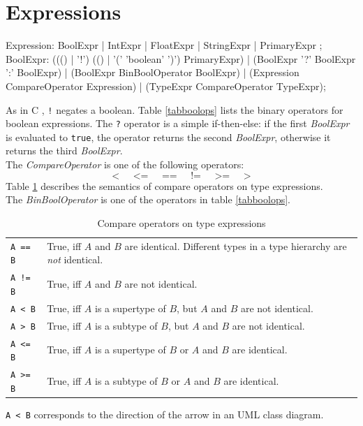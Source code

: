 \section{Expressions}
\label{expressions}
\begin{rail}
  Expression: BoolExpr | IntExpr | FloatExpr | StringExpr | PrimaryExpr ;  
  BoolExpr: ((() | '!') (() | '(' 'boolean' ')') PrimaryExpr) | (BoolExpr '?' BoolExpr ':' BoolExpr) | (BoolExpr BinBoolOperator BoolExpr) | (Expression CompareOperator Expression) | (TypeExpr CompareOperator TypeExpr);
\end{rail}
As in C \cite{Sch:1990:ANSIC}, \texttt{!} negates a boolean. Table \ref{tabboolops} lists the binary operators for boolean expressions. The \texttt{?} operator is a simple if-then-else: if the first \emph{BoolExpr} is evaluated to \texttt{true}, the operator returns the second \emph{BoolExpr}, otherwise it returns the third \emph{BoolExpr}.\\
The \emph{CompareOperator} is one of the following operators:
\[ \texttt{<} \;\;\;\;\; \texttt{<=} \;\;\;\;\; \texttt{==} \;\;\;\;\; \texttt{!=} \;\;\;\;\; \texttt{>=} \;\;\;\;\; \texttt{>} \]
Table \ref{compandtypes} describes the semantics of compare operators on type expressions.\\
The \emph{BinBoolOperator} is one of the operators in table \ref{tabboolops}.
\begin{table}[htbp]
\label{compandtypes} 
  \centering
  \begin{tabularx}{\linewidth}{|l|X|} \hline
    \texttt{A == B} & True, iff $A$ and $B$ are identical. Different types in a type hierarchy are \emph{not} identical. \\
    \texttt{A != B} & True, iff $A$ and $B$ are not identical. \\
    \texttt{A < B} & True, iff $A$ is a supertype of $B$, but $A$ and $B$ are not identical. \\
    \texttt{A > B} & True, iff $A$ is a subtype of $B$, but $A$ and $B$ are not identical. \\
    \texttt{A <= B} & True, iff $A$ is a supertype of $B$ or $A$ and $B$ are identical. \\
    \texttt{A >= B} & True, iff $A$ is a subtype of $B$ or $A$ and $B$ are identical. \\ \hline
  \end{tabularx}
  \caption{Compare operators on type expressions}
\end{table}
\begin{note}
  \texttt{A < B} corresponds to the direction of the arrow in an UML class diagram.
\end{note}

